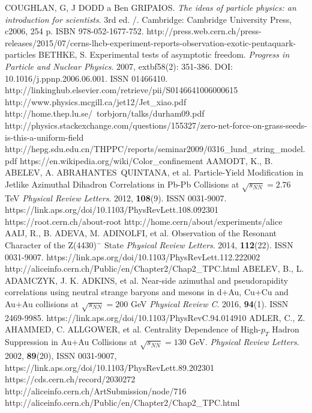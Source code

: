 \documentclass[thesismargins, thesislinespacing]{rnthesis}
\begin{document}
\renewcommand{\bibname}{Zoznam pou�itej literat�ry}
\begin{thebibliography}{}
COUGHLAN, G, J DODD a Ben GRIPAIOS. \textit{The ideas of particle physics: an introduction for scientists}. 3rd ed. /. Cambridge: Cambridge University Press, c2006, 254 p. ISBN 978-052-1677-752.
http://press.web.cern.ch/press-releases/2015/07/cerns-lhcb-experiment-reports-observation-exotic-pentaquark-particles
BETHKE, S. Experimental tests of asymptotic freedom. \textit{Progress in Particle and Nuclear Physics}. 2007, extbf{58}(2): 351-386. DOI: 10.1016/j.ppnp.2006.06.001. ISSN 01466410.  http://linkinghub.elsevier.com/retrieve/pii/S0146641006000615
http://www.physics.mcgill.ca/jet12/Jet\_xiao.pdf
http://home.thep.lu.se/~torbjorn/talks/durham09.pdf	
http://physics.stackexchange.com/questions/155327/zero-net-force-on-grass-seeds-is-this-a-uniform-field
http://hepg.sdu.edu.cn/THPPC/reports/seminar2009/0316\_lund\_string\_model.pdf
https://en.wikipedia.org/wiki/Color\_confinement
AAMODT, K., B. ABELEV, A. ABRAHANTES QUINTANA, et al. Particle-Yield Modification in Jetlike Azimuthal Dihadron Correlations in Pb-Pb Collisions at $\sqrt{s_{NN}} = 2.76$ TeV \textit{Physical Review Letters}. 2012, \textbf{108}(9). ISSN 0031-9007. https://link.aps.org/doi/10.1103/PhysRevLett.108.092301
https://root.cern.ch/about-root
http://home.cern/about/experiments/alice
AAIJ, R., B. ADEVA, M. ADINOLFI, et al. Observation of the Resonant Character of the Z(4430)$^{-}$ State \textit{Physical Review Letters}. 2014, \textbf{112}(22). ISSN 0031-9007. https://link.aps.org/doi/10.1103/PhysRevLett.112.222002
http://aliceinfo.cern.ch/Public/en/Chapter2/Chap2\_TPC.html
ABELEV, B., L. ADAMCZYK, J. K. ADKINS, et al. Near-side azimuthal and pseudorapidity correlations using neutral strange baryons and mesons in d+Au, Cu+Cu and Au+Au collisions at $\sqrt{s_{NN}}=200$ GeV \textit{Physical Review C}. 2016, \textbf{94}(1). ISSN 2469-9985. https://link.aps.org/doi/10.1103/PhysRevC.94.014910
ADLER, C., Z. AHAMMED, C. ALLGOWER, et al. Centrality Dependence of High-$p_T$ Hadron Suppression in Au+Au Collisions at $\sqrt{s_{NN}} = 130$ GeV. \textit{Physical Review Letters}. 2002, \textbf{89}(20), ISSN 0031-9007, https://link.aps.org/doi/10.1103/PhysRevLett.89.202301
https://cds.cern.ch/record/2030272
http://aliceinfo.cern.ch/ArtSubmission/node/716
http://aliceinfo.cern.ch/Public/en/Chapter2/Chap2\_TPC.html

\end{thebibliography}
%
\end{document}
